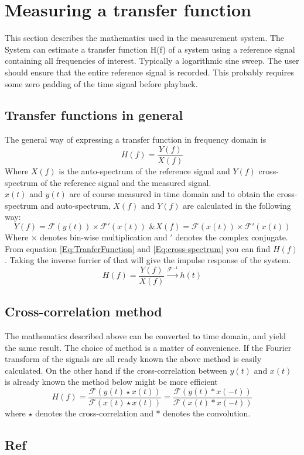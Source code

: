 \section{Measuring a transfer function}
This section describes the mathematics used in the measurement system. The System can estimate a transfer function H(f) of a system using a reference signal containing all frequencies of interest. Typically  a logarithmic sine sweep. The user should ensure that the entire reference signal is recorded. This probably requires some zero padding of the time signal before playback.
\subsection{Transfer functions in general}
The general way of expressing a transfer function in frequency domain is
\begin{equation}
H(f)=\frac{Y(f)}{X(f)}
\label{Eq:TranferFunction}
\end{equation}
Where $X(f)$ is the auto-spectrum of the reference signal and $Y(f)$ cross-spectrum of the reference signal and the measured signal.\\
$x(t)$ and $y(t)$ are of course measured in time domain and to obtain the cross-spectrum and auto-spectrum, $X(f)$ and $Y(f)$ are calculated in the following way:
\begin{equation}
Y(f)=\mathscr{F}(y(t))\times\mathscr{F}'(x(t)) \text{ \& } X(f)=\mathscr{F}(x(t))\times\mathscr{F}'(x(t))
\label{Eq:cross-spectrum}
\end{equation}
Where $\times$ denotes bin-wise multiplication and $'$ denotes the complex conjugate. \\
From equation \ref{Eq:TranferFunction} and \ref{Eq:cross-spectrum} you can find $H(f)$. Taking the inverse furrier of that will give the impulse response of the system. 
\begin{equation}
H(f) = \frac{Y(f)}{X(f)} \xrightarrow{\mathscr{F}^{-1}} h(t)
\label{Eq:Impulseresponse}
\end{equation} 

\subsection{Cross-correlation method}
The mathematics described above can be converted to time domain, and yield the same result. The choice of method is a matter of convenience. If the Fourier transform of the signals are all ready known the above method is easily calculated. On the other hand if the cross-correlation between $y(t)$ and $x(t)$ is already known the method below might be more efficient
\begin{equation}
H(f)=\dfrac{\mathscr{F}(y(t)\star x(t))} {\mathscr{F}(x(t)\star x(t))}=
\dfrac{\mathscr{F}(y(t)\ast x(-t))} {\mathscr{F}(x(t)\ast x(-t))}
\label{Eq:Xcorr method}
\end{equation}  
where $\star $ denotes the cross-correlation and $\ast $ denotes the convolution. %

\subsection{Ref}
\citep{TutorialMeasurementPowerSpectra}




